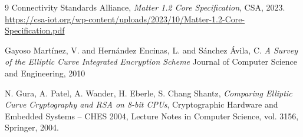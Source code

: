 \documentclass[12pt, a4paper]{report}
\begin{document}
\begin{thebibliography}{9}
    Connectivity Standards Alliance,
    \textit{Matter 1.2 Core Specification},
    CSA, 2023.\\
    \url{https://csa-iot.org/wp-content/uploads/2023/10/Matter-1.2-Core-Specification.pdf}

    Gayoso Mart\'inez, V. and Hern\'andez Encinas, L. and S\'anchez \'Avila, C.
    \textit{A Survey of the Elliptic Curve Integrated Encryption Scheme}
    Journal of Computer Science and Engineering, 2010

    N. Gura, A. Patel, A. Wander, H. Eberle, S. Chang Shantz,
    \textit{Comparing Elliptic Curve Cryptography and RSA on 8-bit CPUs},
    Cryptographic Hardware and Embedded Systems -- CHES 2004,
    Lecture Notes in Computer Science, vol. 3156, Springer, 2004.

\end{thebibliography}
\end{document}
